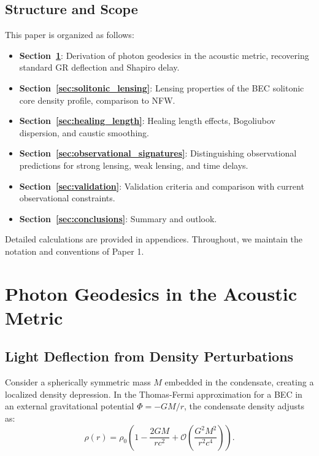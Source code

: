 \documentclass[11pt,a4paper]{article}
\theoremstyle{definition}
\theoremstyle{remark}
\begin{document}
\subsection{Structure and Scope}
\label{sec:structure}

This paper is organized as follows:
\begin{itemize}[leftmargin=*, itemsep=0.2em]
\item \textbf{Section~\ref{sec:photon_geodesics}}: Derivation of photon geodesics in the acoustic metric, recovering standard GR deflection and Shapiro delay.
\item \textbf{Section~\ref{sec:solitonic_lensing}}: Lensing properties of the BEC solitonic core density profile, comparison to NFW.
\item \textbf{Section~\ref{sec:healing_length}}: Healing length effects, Bogoliubov dispersion, and caustic smoothing.
\item \textbf{Section~\ref{sec:observational_signatures}}: Distinguishing observational predictions for strong lensing, weak lensing, and time delays.
\item \textbf{Section~\ref{sec:validation}}: Validation criteria and comparison with current observational constraints.
\item \textbf{Section~\ref{sec:conclusions}}: Summary and outlook.
\end{itemize}

Detailed calculations are provided in appendices. Throughout, we maintain the notation and conventions of Paper 1.

\section{Photon Geodesics in the Acoustic Metric}
\label{sec:photon_geodesics}

\subsection{Light Deflection from Density Perturbations}
\label{sec:deflection_derivation}

Consider a spherically symmetric mass $M$ embedded in the condensate, creating a localized density depression. In the Thomas-Fermi approximation for a BEC in an external gravitational potential $\Phi = -GM/r$, the condensate density adjusts as:
\begin{equation}
\label{eq:density_perturbation}
\rho(r) = \rho_0 \left(1 - \frac{2GM}{rc^2} + \mathcal{O}\left(\frac{G^2M^2}{r^2c^4}\right) \right).
\end{equation}
\end{document}
